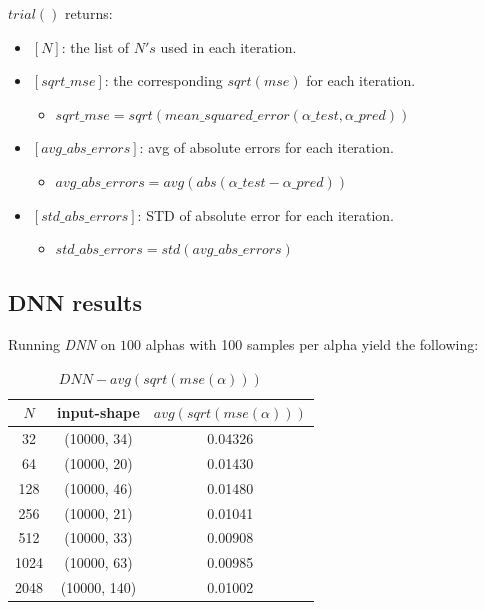 \documentclass[a4paper, 12pt]{report}
\begin{document}
\par $trial()$ returns:
\begin{itemize}
  \item $[N]$: the list of $N's$ used in each iteration.
  \item $[sqrt\_mse]$: the corresponding $sqrt(mse)$ for each iteration.
  \begin{itemize}
    \item $sqrt\_mse = sqrt(mean\_squared\_error(\alpha\_test, \alpha\_pred))$
  \end{itemize}
  \item $[avg\_abs\_errors]$: avg of absolute errors for each iteration.
  \begin{itemize}
    \item $avg\_abs\_errors = avg(abs(\alpha\_test - \alpha\_pred))$
  \end{itemize}
  \item $[std\_abs\_errors]$: STD of absolute error for each iteration.
  \begin{itemize}
    \item $std\_abs\_errors = std(avg\_abs\_errors)$
  \end{itemize}
\end{itemize}

\pagebreak
\subsection{DNN results}
\par Running \textit{DNN} on $100$ alphas with 100 samples per alpha yield the following:

\begin{table}[h!]
    \centering
    \begin{tabular}{||c c c||} 
        \hline
        $N$ & input-shape & $avg(sqrt(mse(\alpha)))$ \\ [0.5ex] 
        \hline\hline
        32 & (10000, 34) & 0.04326 \\ 
        \hline
        64 & (10000, 20) & 0.01430 \\
        \hline
        128 & (10000, 46) & 0.01480 \\
        \hline
        256 & (10000, 21) & 0.01041 \\
        \hline
        512 & (10000, 33) & 0.00908 \\ 
        \hline
        1024 & (10000, 63) & 0.00985 \\ 
        \hline
        2048 & (10000, 140) & 0.01002 \\ 
        \hline
    \end{tabular}
    \caption[$mse(\alpha)$ for $DNN$]{$DNN - avg(sqrt(mse(\alpha)))$}
    \label{table:1}
\end{table}
\end{document}
